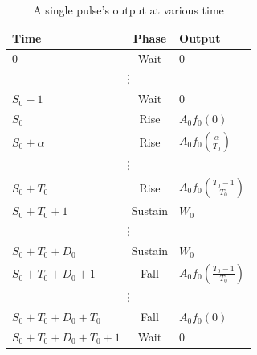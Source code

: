\begin{table}[ht]
    \centering
    \caption{A single pulse's output at various time}
    \begin{tabularx}{\textwidth}{|X|c|X|}
        \hline
        Time & Phase & Output \\
        \hline
        0&Wait&0\\
        \hline
        \multicolumn{3}{|c|}{\vdots}\\
        \hline
        $S_0-1$&Wait&0\\
        \hline
        $S_0$&Rise&$A_0f_0(0)$\\
        \hline
        $S_0+\alpha$&Rise&$A_0f_0(\frac{\alpha}{T_0})$\\
        \hline
        \multicolumn{3}{|c|}{\vdots}\\
        \hline
        $S_0+T_0$&Rise&$A_0f_0(\frac{T_0-1}{T_0})$\\
        \hline
        $S_0+T_0+1$&Sustain&$W_0$\\
        \hline
        \multicolumn{3}{|c|}{\vdots}\\
        \hline
        $S_0+T_0+D_0$&Sustain&$W_0$\\
        \hline
        $S_0+T_0+D_0+1$&Fall&$A_0f_0(\frac{T_0-1}{T_0})$\\
        \hline
        \multicolumn{3}{|c|}{\vdots}\\
        \hline
        $S_0+T_0+D_0+T_0$&Fall&$A_0f_0(0)$\\
        \hline
        $S_0+T_0+D_0+T_0+1$&Wait&$0$\\
        \hline
    \end{tabularx}
    \label{tab:pulse_eqs}
\end{table}



